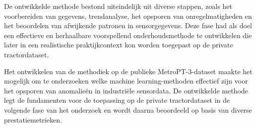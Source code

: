 De ontwikkelde methode bestond uiteindelijk uit diverse stappen, zoals het voorbereiden van gegevens, trendanalyse, het opsporen van onregelmatigheden en het beoordelen van afwijkende patronen in sensorgegevens. Deze fase had als doel een effectieve en herhaalbare voorspellend onderhoudsmethode te ontwikkelen die later in een realistische praktijkcontext kon worden toegepast op de private tractordataset.

Het ontwikkelen van de methodiek op de publieke MetroPT-3-dataset maakte het mogelijk om te onderzoeken welke machine learning-methoden effectief zijn voor het opsporen van anomalieën in industriële sensordata. De ontwikkelde methode legt de fundamenten voor de toepassing op de private tractordataset in de volgende fase van het onderzoek en wordt daarna beoordeeld op basis van diverse prestatiemetrieken.





